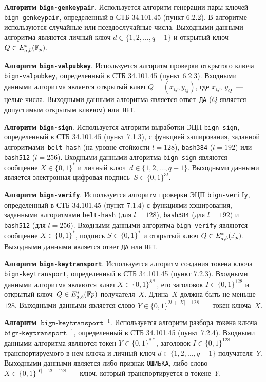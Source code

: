 {\bf Алгоритм \texttt{bign-genkeypair}}.
Используется алгоритм генерации пары ключей 
\texttt{bign-genkeypair}, определенный в СТБ 34.101.45 (пункт 6.2.2).
В алгоритме используются случайные или псевдослучайные числа. Выходными данными 
алгоритма являются личный ключ $d \in\{1,2,\ldots,q-1\}$ и открытый 
ключ~$Q\in E_{a,b}^*({\mathbb F}_p)$.

{\bf Алгоритм \texttt{bign-valpubkey}}.
Используется алгоритм проверки открытого ключа 
\texttt{bign-valpubkey}, определенный в СТБ 34.101.45 (пункт 6.2.3). Входными 
данными алгоритма является открытый ключ $Q = (x_Q, y_Q)$, 
где $x_Q$, $y_Q$~--- целые числа. Выходными данными алгоритма является 
ответ~\texttt{ДА} ($Q$ является допустимым открытым ключом) или~\texttt{НЕТ}.

{\bf Алгоритм \texttt{bign-sign}}. Используется алгоритм выработки ЭЦП 
\texttt{bign-sign}, определенный в СТБ 34.101.45 (пункт 7.1.3), с функцией 
хэширования, заданной алгоритмами~\texttt{belt-hash} (на уровне стойкости $l=128$),
\texttt{bash384} ($l=192$) или \texttt{bash512} ($l=256$).
Входными данными алгоритма \texttt{bign-sign} являются сообщение 
$X\in\{0,1\}^*$ и личный ключ~$d\in\{1,2,\ldots,q-1\}$.
Выходными данными является электронная цифровая подпись~$S\in\{0,1\}^{3l}$.

{\bf Алгоритм \texttt{bign-verify}}.
Используется алгоритм проверки ЭЦП \texttt{bign-verify}, 
определенный в СТБ 34.101.45 (пункт 7.1.4) с функциями хэширования, 
заданными алгоритмами \texttt{belt-hash} (для $l=128$), 
\texttt{bash384} (для $l=192$) и \texttt{bash512} (для $l=256$). 
Входными данными алгоритма 
\texttt{bign-verify} являются сообщение $X\in\{0,1\}^*$, 
подпись $S\in\{0,1\}^*$ и открытый ключ $Q \in E_{a,b}^*({\mathbb F}_p)$.
Выходными данными является ответ \texttt{ДА} или \texttt{НЕТ}.

{\bf Алгоритм \texttt{bign-keytransport}}.
Используется алгоритм создания токена ключа 
\texttt{bign-keytransport}, определенный в СТБ 34.101.45 (пункт 7.2.3).
Входными данными алгоритма являются ключ $X\in\{0,1\}^{8*}$, 
его заголовок $I\in\{0,1\}^{128}$ и открытый ключ~$Q\in E_{a,b}^*({\mathbb F} p)$ 
получателя~$X$. Длина~$X$ должна быть не меньше~$128$.
Выходными данными является слово $Y\in\{0,1\}^{2l+|X|+128}$~--- токен ключа~$X$.
 
{\bf Алгоритм~$\texttt{bign-keytransport}^{-1}$}.
Используется алгоритм разбора токена ключа~$\texttt{bign-keytransport}^{-1}$, 
определенный в СТБ 34.101.45 (пункт 7.2.4). Входными 
данными алгоритма являются токен $Y\in\{0,1\}^{8*}$, 
заголовок $I\in\{0,1\}^{128}$ транспортируемого в нем ключа 
и личный ключ $d\in\{1,2,\ldots,q-1\}$ получателя~$Y$.
Выходными данными является либо признак \texttt{ОШИБКА}, 
либо слово~$X\in\{0,1\}^{|Y|-2l-128}$~--- ключ, 
который транспортируется в токене~$Y$.

